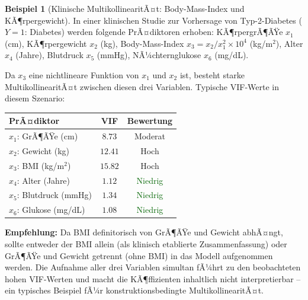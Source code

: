 ﻿\documentclass[12pt, a4paper]{article}
\theoremstyle{definition}
\newtheorem{example}[theorem]{Beispiel}
\theoremstyle{remark}
\begin{document}
\begin{example}[Klinische MultikollinearitÃ¤t: Body-Mass-Index und KÃ¶rpergewicht]
	\label{ex:vif_bmi}
	In einer klinischen Studie zur Vorhersage von Typ-2-Diabetes ($Y = 1$: Diabetes)
	werden folgende PrÃ¤diktoren erhoben: KÃ¶rpergrÃ¶ÃŸe $x_1$ (cm), KÃ¶rpergewicht $x_2$ (kg),
	Body-Mass-Index $x_3 = x_2 / x_1^2 \times 10^4$ (kg/m$^2$), Alter $x_4$ (Jahre), 
	Blutdruck $x_5$ (mmHg), NÃ¼chternglukose $x_6$ (mg/dL).
	
	Da $x_3$ eine nichtlineare Funktion von $x_1$ und $x_2$ ist, besteht starke 
	MultikollinearitÃ¤t zwischen diesen drei Variablen.
	Typische VIF-Werte in diesem Szenario:
	
	\begin{center}
		\begin{tabular}{lcc}
			\toprule
			PrÃ¤diktor & VIF & Bewertung \\
			\midrule
			$x_1$: GrÃ¶ÃŸe (cm) & $8.73$ & Moderat \\
			$x_2$: Gewicht (kg) & $12.41$ & \textcolor{accentred}{Hoch} \\
			$x_3$: BMI (kg/m$^2$) & $15.82$ & \textcolor{accentred}{Hoch} \\
			$x_4$: Alter (Jahre) & $1.12$ & \textcolor{darkgreen}{Niedrig} \\
			$x_5$: Blutdruck (mmHg) & $1.34$ & \textcolor{darkgreen}{Niedrig} \\
			$x_6$: Glukose (mg/dL) & $1.08$ & \textcolor{darkgreen}{Niedrig} \\
			\bottomrule
		\end{tabular}
	\end{center}
	
	\textbf{Empfehlung:} Da BMI definitorisch von GrÃ¶ÃŸe und Gewicht abhÃ¤ngt, sollte entweder
	der BMI allein (als klinisch etablierte Zusammenfassung) oder GrÃ¶ÃŸe und Gewicht getrennt
	(ohne BMI) in das Modell aufgenommen werden. Die Aufnahme aller drei Variablen simultan
	fÃ¼hrt zu den beobachteten hohen VIF-Werten und macht die KÃ¶ffizienten inhaltlich nicht
	interpretierbar -- ein typisches Beispiel fÃ¼r konstruktionsbedingte MultikollinearitÃ¤t.
\end{example}
\end{document}
